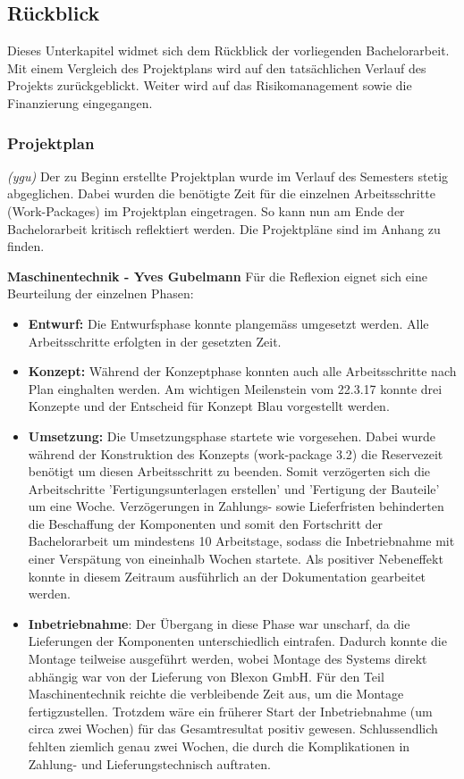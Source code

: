 \newpage
\subsection{Rückblick}
Dieses Unterkapitel widmet sich dem Rückblick der vorliegenden Bachelorarbeit. Mit einem Vergleich des Projektplans wird auf den tatsächlichen Verlauf des Projekts zurückgeblickt. Weiter wird auf das Risikomanagement sowie die Finanzierung eingegangen.
\subsubsection{Projektplan}
\label{projektplan}
\textit{(ygu)} Der zu Beginn erstellte Projektplan wurde im Verlauf des Semesters stetig abgeglichen. Dabei wurden die benötigte Zeit für die einzelnen Arbeitsschritte (Work-Packages) im Projektplan eingetragen. So kann nun am Ende der Bachelorarbeit kritisch reflektiert werden. Die Projektpläne sind im Anhang zu finden.
\newline

\textbf{Maschinentechnik - Yves Gubelmann}
\newline
Für die  Reflexion eignet sich eine Beurteilung der einzelnen Phasen:
\begin{itemize}
	\item \textbf{Entwurf:} Die Entwurfsphase konnte plangemäss umgesetzt werden. Alle Arbeitsschritte erfolgten in der gesetzten Zeit.
	
	\item \textbf{Konzept:} Während der Konzeptphase konnten auch alle Arbeitsschritte nach Plan einghalten werden. Am wichtigen Meilenstein vom 22.3.17 konnte drei Konzepte und der Entscheid für Konzept Blau vorgestellt werden.
	
	\item \textbf{Umsetzung:} Die Umsetzungsphase startete wie vorgesehen. Dabei wurde während der Konstruktion des Konzepts (work-package 3.2) die Reservezeit benötigt um diesen Arbeitsschritt zu beenden. Somit verzögerten sich die Arbeitschritte 'Fertigungsunterlagen erstellen' und 'Fertigung der Bauteile' um eine Woche. Verzögerungen in Zahlungs- sowie Lieferfristen behinderten die Beschaffung der Komponenten und somit den Fortschritt der Bachelorarbeit um mindestens 10 Arbeitstage, sodass die Inbetriebnahme mit einer Verspätung von eineinhalb Wochen startete. Als positiver Nebeneffekt konnte in diesem Zeitraum ausführlich an der Dokumentation gearbeitet werden.
	
	\item \textbf{Inbetriebnahme}: Der Übergang in diese Phase war unscharf, da die Lieferungen der Komponenten unterschiedlich eintrafen. Dadurch konnte die Montage teilweise ausgeführt werden, wobei Montage des Systems direkt abhängig war von der Lieferung von Blexon GmbH. Für den Teil Maschinentechnik reichte die verbleibende Zeit aus, um die Montage fertigzustellen. Trotzdem wäre ein früherer Start der Inbetriebnahme (um circa zwei Wochen) für das Gesamtresultat positiv gewesen. Schlussendlich fehlten ziemlich genau zwei Wochen, die durch die Komplikationen in Zahlung- und Lieferungstechnisch auftraten.

	
\end{itemize} 

